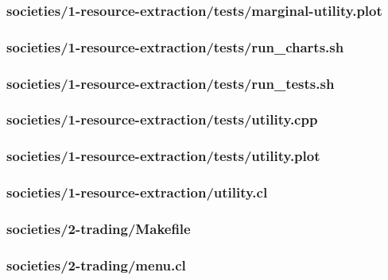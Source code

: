 \documentclass{article}
\begin{document}
\subsubsection*{societies/1-resource-extraction/tests/marginal-utility.plot}


\subsubsection*{societies/1-resource-extraction/tests/run\_charts.sh}


\subsubsection*{societies/1-resource-extraction/tests/run\_tests.sh}


\subsubsection*{societies/1-resource-extraction/tests/utility.cpp}


\subsubsection*{societies/1-resource-extraction/tests/utility.plot}


\subsubsection*{societies/1-resource-extraction/utility.cl}


\subsubsection*{societies/2-trading/Makefile}


\subsubsection*{societies/2-trading/menu.cl}

\end{document}
